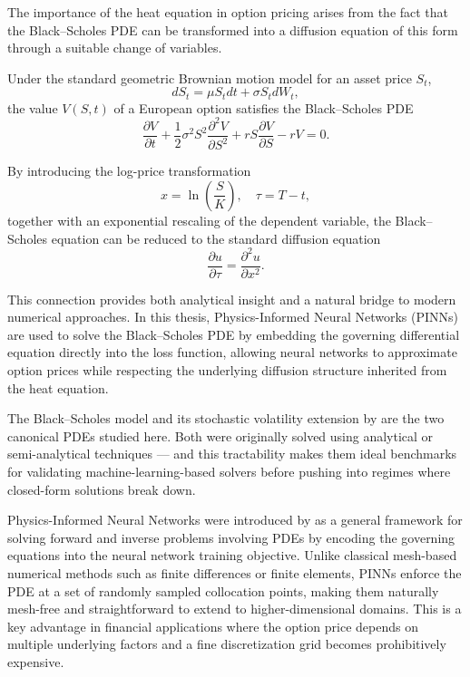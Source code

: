 The importance of the heat equation in option pricing arises from the fact that the Black--Scholes PDE can be transformed into a diffusion equation of this form through a suitable change of variables.

Under the standard geometric Brownian motion model for an asset price $S_t$,
\[
dS_t = \mu S_t dt + \sigma S_t dW_t,
\]
the value $V(S,t)$ of a European option satisfies the Black--Scholes PDE
\[
\frac{\partial V}{\partial t}
+
\frac{1}{2}\sigma^2 S^2 \frac{\partial^2 V}{\partial S^2}
+
rS \frac{\partial V}{\partial S}
-
rV
=
0.
\]

By introducing the log-price transformation
\[
x = \ln\left(\frac{S}{K}\right),
\quad
\tau = T - t,
\]
together with an exponential rescaling of the dependent variable, the Black--Scholes equation can be reduced to the standard diffusion equation
\[
\frac{\partial u}{\partial \tau}
=
\frac{\partial^2 u}{\partial x^2}.
\]

This connection provides both analytical insight and a natural bridge to modern numerical approaches. In this thesis, Physics-Informed Neural Networks (PINNs) are used to solve the Black--Scholes PDE by embedding the governing differential equation directly into the loss function, allowing neural networks to approximate option prices while respecting the underlying diffusion structure inherited from the heat equation.

The Black--Scholes model \parencite{black1973pricing} and its stochastic volatility extension by \textcite{heston1993closed} are the two canonical PDEs studied here. Both were originally solved using analytical or semi-analytical techniques — and this tractability makes them ideal benchmarks for validating machine-learning-based solvers before pushing into regimes where closed-form solutions break down.

Physics-Informed Neural Networks were introduced by \textcite{raissi2019physics} as a general framework for solving forward and inverse problems involving PDEs by encoding the governing equations into the neural network training objective. Unlike classical mesh-based numerical methods such as finite differences or finite elements, PINNs enforce the PDE at a set of randomly sampled collocation points, making them naturally mesh-free and straightforward to extend to higher-dimensional domains. This is a key advantage in financial applications where the option price depends on multiple underlying factors and a fine discretization grid becomes prohibitively expensive.

